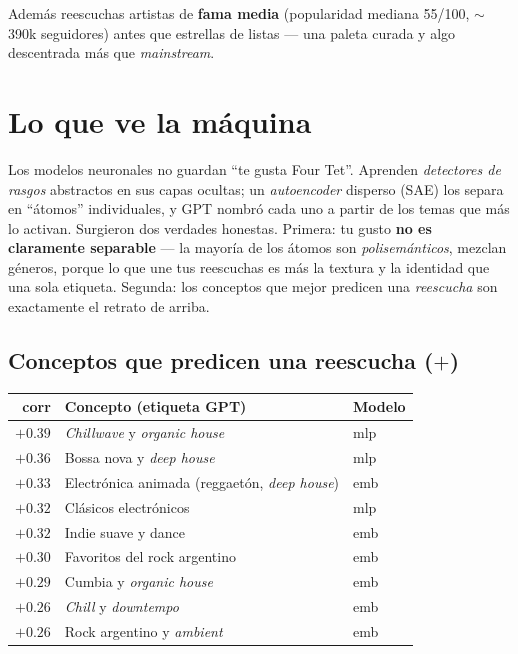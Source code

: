 \documentclass[11pt]{article}
\begin{document}
Además reescuchas artistas de \textbf{fama media} (popularidad mediana 55/100,
$\sim$390k seguidores) antes que estrellas de listas --- una paleta curada y algo
descentrada más que \emph{mainstream}.

\section{Lo que ve la máquina}
Los modelos neuronales no guardan ``te gusta Four Tet''. Aprenden
\emph{detectores de rasgos} abstractos en sus capas ocultas; un
\emph{autoencoder} disperso (SAE) los separa en ``átomos'' individuales, y GPT
nombró cada uno a partir de los temas que más lo activan. Surgieron dos verdades
honestas. Primera: tu gusto \textbf{no es claramente separable} --- la mayoría de
los átomos son \emph{polisemánticos}, mezclan géneros, porque lo que une tus
reescuchas es más la textura y la identidad que una sola etiqueta. Segunda: los
conceptos que mejor predicen una \emph{reescucha} son exactamente el retrato de
arriba.

\subsection{Conceptos que predicen una reescucha ($+$)}
\begin{center}
\begin{tabular}{@{}rll@{}}
\toprule
corr & Concepto (etiqueta GPT) & Modelo \\
\midrule
$+0.39$ & \emph{Chillwave} y \emph{organic house} & mlp \\
$+0.36$ & Bossa nova y \emph{deep house} & mlp \\
$+0.33$ & Electrónica animada (reggaetón, \emph{deep house}) & emb \\
$+0.32$ & Clásicos electrónicos & mlp \\
$+0.32$ & Indie suave y dance & emb \\
$+0.30$ & Favoritos del rock argentino & emb \\
$+0.29$ & Cumbia y \emph{organic house} & emb \\
$+0.26$ & \emph{Chill} y \emph{downtempo} & emb \\
$+0.26$ & Rock argentino y \emph{ambient} & emb \\
\bottomrule
\end{tabular}
\end{center}
\end{document}

